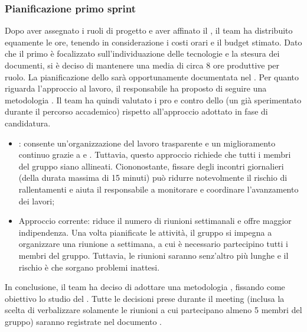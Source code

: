 \subsubsection{Pianificazione primo sprint}
Dopo aver assegnato i ruoli di progetto e aver affinato il \glossario{\WoW}, il team ha distribuito equamente le ore, tenendo in considerazione i costi orari e il budget stimato. Dato che il primo  è focalizzato sull'individuazione delle tecnologie e la stesura dei documenti, si è deciso di mantenere una media di circa 8 ore produttive per ruolo. La pianificazione dello  sarà opportunamente documentata nel \PdP. Per quanto riguarda l'approccio al lavoro, il responsabile ha proposto di seguire una metodologia . Il team ha quindi valutato i pro e contro dello  (un  già sperimentato durante il percorso accademico) rispetto all'approccio adottato in fase di candidatura.
\begin{itemize}
	\item {}: consente un'organizzazione del lavoro trasparente e un miglioramento continuo grazie a  e . Tuttavia, questo approccio richiede che tutti i membri del gruppo siano allineati. Ciononostante, fissare degli incontri giornalieri (della durata massima di 15 minuti) può ridurre notevolmente il rischio di rallentamenti e aiuta il responsabile a monitorare e coordinare l'avanzamento dei lavori;
	\item Approccio corrente: riduce il numero di riunioni settimanali e offre maggior indipendenza. Una volta pianificate le attività, il gruppo si impegna a organizzare una riunione a settimana, a cui è necessario partecipino tutti i membri del gruppo. Tuttavia, le riunioni saranno senz'altro più lunghe e il rischio è che sorgano problemi inattesi.
\end{itemize}

\vspace{0.5\baselineskip}
In conclusione, il team ha deciso di adottare una metodologia , fissando come obiettivo lo studio del  . Tutte le decisioni prese durante il meeting (inclusa la scelta di verbalizzare solamente le riunioni a cui partecipano almeno 5 membri del gruppo) saranno registrate nel documento \NdP.
\clearpage
